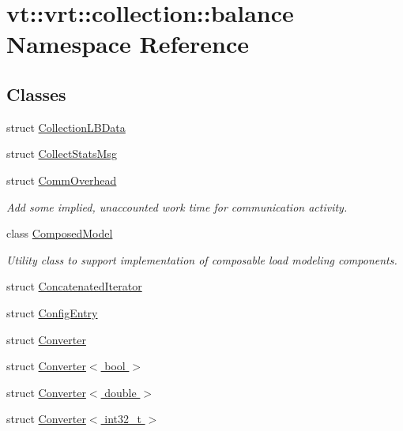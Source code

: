 \hypertarget{namespacevt_1_1vrt_1_1collection_1_1balance}{}\section{vt\+:\+:vrt\+:\+:collection\+:\+:balance Namespace Reference}
\label{namespacevt_1_1vrt_1_1collection_1_1balance}
\subsection*{Classes}
\begin{DoxyCompactItemize}
\item 
struct \hyperlink{structvt_1_1vrt_1_1collection_1_1balance_1_1_collection_l_b_data}{Collection\+L\+B\+Data}
\item 
struct \hyperlink{structvt_1_1vrt_1_1collection_1_1balance_1_1_collect_stats_msg}{Collect\+Stats\+Msg}
\item 
struct \hyperlink{structvt_1_1vrt_1_1collection_1_1balance_1_1_comm_overhead}{Comm\+Overhead}
\begin{DoxyCompactList}\small\item\em Add some implied, unaccounted work time for communication activity. \end{DoxyCompactList}\item 
class \hyperlink{classvt_1_1vrt_1_1collection_1_1balance_1_1_composed_model}{Composed\+Model}
\begin{DoxyCompactList}\small\item\em Utility class to support implementation of composable load modeling components. \end{DoxyCompactList}\item 
struct \hyperlink{structvt_1_1vrt_1_1collection_1_1balance_1_1_concatenated_iterator}{Concatenated\+Iterator}
\item 
struct \hyperlink{structvt_1_1vrt_1_1collection_1_1balance_1_1_config_entry}{Config\+Entry}
\item 
struct \hyperlink{structvt_1_1vrt_1_1collection_1_1balance_1_1_converter}{Converter}
\item 
struct \hyperlink{structvt_1_1vrt_1_1collection_1_1balance_1_1_converter_3_01bool_01_4}{Converter$<$ bool $>$}
\item 
struct \hyperlink{structvt_1_1vrt_1_1collection_1_1balance_1_1_converter_3_01double_01_4}{Converter$<$ double $>$}
\item 
struct \hyperlink{structvt_1_1vrt_1_1collection_1_1balance_1_1_converter_3_01int32__t_01_4}{Converter$<$ int32\+\_\+t $>$}

\end{DoxyCompactItemize}
